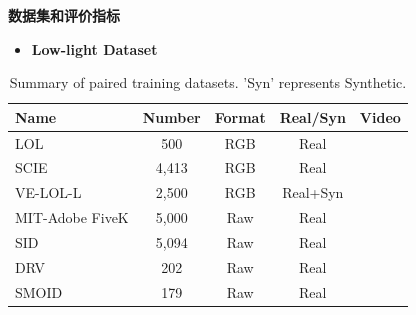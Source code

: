 \documentclass[CJK,aspectratio=169]{beamer}  %
\begin{document}
	\begin{frame}
		{ \yahei \textbf{数据集和评价指标}}
		
		\begin{itemize} 
			\item \textbf{Low-light Dataset}
		\end{itemize}
		
		\begin{table}[!htbp]
			\centering
			\tiny
				\begin{tabular}{>{\centering\arraybackslash}m{3cm}|c|c|c|c}
					
					\hline
					
					\textbf{Name} & \textbf{Number} & \textbf{Format} & \textbf{Real/Syn} & \textbf{Video} \\
					
					\hline
					
					LOL\textcolor{blue}{\citep{wei2018deep}} & 500 & RGB & Real & \\
					
					SCIE\textcolor{blue}{\citep{cai2018learning}} & 4,413 & RGB & Real & \\
					
					VE-LOL-L\textcolor{blue}{\citep{jiang2019learning}} & 2,500 & RGB & Real+Syn & \\
					
					MIT-Adobe FiveK\textcolor{blue}{\citep{bychkovsky2011learning}} & 5,000 & Raw & Real & \\
					
					SID\textcolor{blue}{\citep{wei2018deep}} & 5,094 & Raw & Real & \\
					
					DRV\textcolor{blue}{\citep{chen2019seeing}} & 202 & Raw & Real & \checkmark  \\
					
					SMOID\textcolor{blue}{\citep{jiang2019learning}} & 179 & Raw & Real & \checkmark  \\
					
					\hline
					
				\end{tabular}
			\captionsetup{font=scriptsize} %
			\caption{\label{tab: Paired_training_datases}
				Summary of paired training datasets. 'Syn' represents Synthetic.} %
			
		\end{table}
	\end{frame}
	
\end{document}
